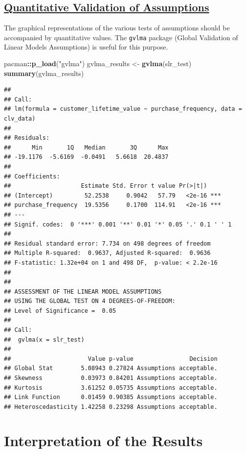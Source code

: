 \documentclass[
]{article}
\newenvironment{Shaded}{\begin{snugshade}}{\end{snugshade}}
\newcommand{\FunctionTok}[1]{\textcolor[rgb]{0.13,0.29,0.53}{\textbf{#1}}}
\newcommand{\NormalTok}[1]{#1}
\newcommand{\OtherTok}[1]{\textcolor[rgb]{0.56,0.35,0.01}{#1}}
\newcommand{\SpecialCharTok}[1]{\textcolor[rgb]{0.81,0.36,0.00}{\textbf{#1}}}
\newcommand{\StringTok}[1]{\textcolor[rgb]{0.31,0.60,0.02}{#1}}
\begin{document}
\subsection{\texorpdfstring{\ul{\textbf{Quantitative Validation of
Assumptions}}}{Quantitative Validation of Assumptions}}\label{quantitative-validation-of-assumptions}

The graphical representations of the various tests of assumptions should
be accompanied by quantitative values. The \texttt{gvlma} package
(Global Validation of Linear Models Assumptions) is useful for this
purpose.

\begin{Shaded}
\begin{Highlighting}[]
\NormalTok{pacman}\SpecialCharTok{::}\FunctionTok{p\_load}\NormalTok{(}\StringTok{"gvlma"}\NormalTok{)}
\NormalTok{gvlma\_results }\OtherTok{\textless{}{-}} \FunctionTok{gvlma}\NormalTok{(slr\_test)}
\FunctionTok{summary}\NormalTok{(gvlma\_results)}
\end{Highlighting}
\end{Shaded}

\begin{verbatim}
## 
## Call:
## lm(formula = customer_lifetime_value ~ purchase_frequency, data = clv_data)
## 
## Residuals:
##      Min       1Q   Median       3Q      Max 
## -19.1176  -5.6169  -0.0491   5.6618  20.4837 
## 
## Coefficients:
##                    Estimate Std. Error t value Pr(>|t|)    
## (Intercept)         52.2538     0.9042   57.79   <2e-16 ***
## purchase_frequency  19.5356     0.1700  114.91   <2e-16 ***
## ---
## Signif. codes:  0 '***' 0.001 '**' 0.01 '*' 0.05 '.' 0.1 ' ' 1
## 
## Residual standard error: 7.734 on 498 degrees of freedom
## Multiple R-squared:  0.9637, Adjusted R-squared:  0.9636 
## F-statistic: 1.32e+04 on 1 and 498 DF,  p-value: < 2.2e-16
## 
## 
## ASSESSMENT OF THE LINEAR MODEL ASSUMPTIONS
## USING THE GLOBAL TEST ON 4 DEGREES-OF-FREEDOM:
## Level of Significance =  0.05 
## 
## Call:
##  gvlma(x = slr_test) 
## 
##                      Value p-value                Decision
## Global Stat        5.08943 0.27824 Assumptions acceptable.
## Skewness           0.03973 0.84201 Assumptions acceptable.
## Kurtosis           3.61252 0.05735 Assumptions acceptable.
## Link Function      0.01459 0.90385 Assumptions acceptable.
## Heteroscedasticity 1.42258 0.23298 Assumptions acceptable.
\end{verbatim}

\section{Interpretation of the
Results}\label{interpretation-of-the-results}
\end{document}
